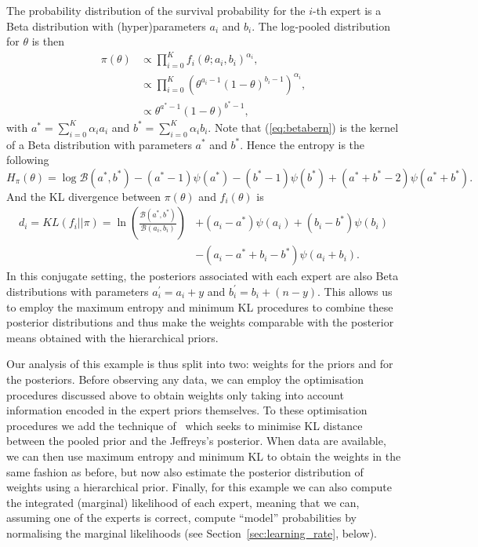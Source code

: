 \documentclass[12pt]{article}
\begin{document}
The probability distribution of the survival probability for the $i$-th expert is a Beta distribution with (hyper)parameters $a_i$ and $b_i$.
The log-pooled distribution for $\theta$ is then
\begin{align}
\nonumber
\pi(\theta) & \propto \prod_{i=0}^{K}f_i(\theta;a_i,b_i)^{\alpha_i},\\
\nonumber
            & \propto \prod_{i=0}^{K} \left(\theta^{a_i-1}(1-\theta)^{b_i-1} \right)^{\alpha_i},\\
\label{eq:betabern}
&\propto \theta^{a^*-1}(1-\theta)^{b^*-1},
\end{align}
with $a^* =\sum_{i=0}^{K}\alpha_ia_i$ and $b^* = \sum_{i=0}^{K}\alpha_ib_i$.
Note that (\ref{eq:betabern}) is the kernel of a Beta distribution with parameters $a^*$ and $b^*$. Hence the entropy is the following
\begin{equation}
 \label{eq:entropybeta}
 H_{\pi}(\theta) = \log \mathcal{B}(a^*,b^*) - (a^*-1)\psi(a^*) - (b^*-1)\psi(b^*) + (a^*+b^* -2)\psi(a^*+b^*).
\end{equation}
And the KL divergence between $\pi(\theta)$ and $f_i(\theta)$  is
\begin{equation}
\begin{split}
 \label{eq:KLbeta}
 d_i = KL(f_i || \pi) = \ln\left(\frac{\mathcal{B}(a^*, b^*)}{\mathcal{B}(a_i, 
b_i)}\right) & + (a_i - a^*) \psi(a_i)+ (b_i - b^*)\psi(b_i) \\
 &- (a_i-a^* + b_i - b^*)\psi(a_i + b_i).
\end{split}
\end{equation}
In this conjugate setting, the posteriors associated with each expert are also Beta distributions with
parameters $a_i^\prime = a_i + y$ and $b_i^\prime = b_i + (n-y)$.
This allows us to employ the maximum entropy and minimum KL procedures to combine these posterior distributions and thus make the weights comparable with the posterior means obtained with the hierarchical priors.

Our analysis of this example is thus split into two: weights for the priors and for the posteriors.
Before observing any data, we can employ the optimisation procedures discussed above to obtain weights only taking into account information encoded in the expert priors themselves.
To these optimisation procedures we add the technique of~\textcite{Rufo2012B} which seeks to minimise KL distance between the pooled prior and the Jeffreys's posterior.
When data are available, we can then use maximum entropy and minimum KL to obtain the weights in the same fashion as before, but now  also estimate the posterior distribution of weights using a hierarchical prior.
Finally, for this example we can also compute the integrated (marginal) likelihood of each expert, meaning that we can, assuming one of the experts is correct, compute ``model'' probabilities by normalising the marginal likelihoods (see Section~\ref{sec:learning_rate}, below).
\end{document}
